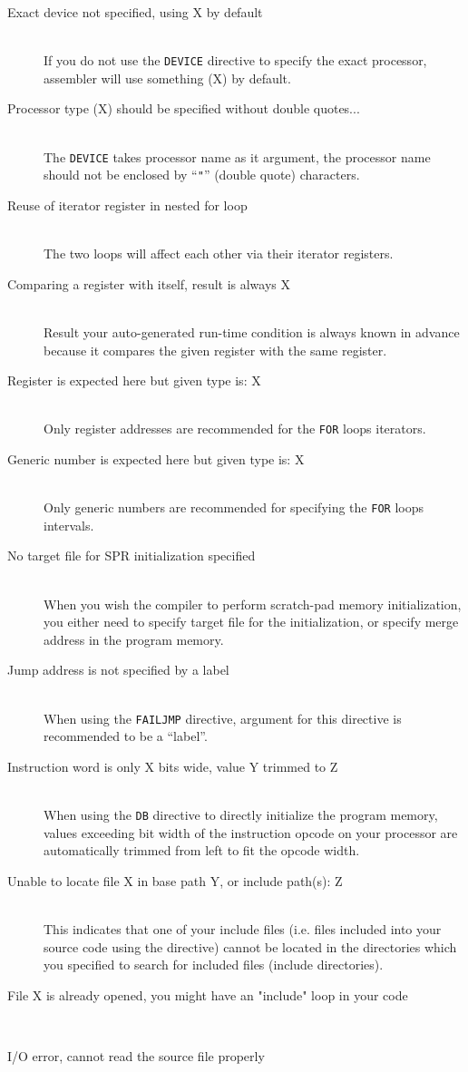 \begin{description}
        \item[Exact device not specified, using X by default]~\\
            If you do not use the \texttt{DEVICE} directive to specify the exact processor, assembler will use something (X) by default.
        \item[Processor type (X) should be specified without double quotes...]~\\
            The \texttt{DEVICE} takes processor name as it argument, the processor name should not be enclosed by ``\texttt{"}'' (double quote) characters.
        \item[Reuse of iterator register in nested for loop]~\\
            The two loops will affect each other via their iterator registers.
        \item[Comparing a register with itself, result is always X]~\\
            Result your auto-generated run-time condition is always known in advance because it compares the given register with the same register.
        \item[Register is expected here but given type is: X]~\\
            Only register addresses are recommended for the \texttt{FOR} loops iterators.
        \item[Generic number is expected here but given type is: X]~\\
            Only generic numbers are recommended for specifying the \texttt{FOR} loops intervals.
        \item[No target file for SPR initialization specified]~\\
            When you wish the compiler to perform scratch-pad memory initialization, you either need to specify target file for the initialization, or specify merge address in the program memory.
        \item[Jump address is not specified by a label]~\\
            When using the \texttt{FAILJMP} directive, argument for this directive is recommended to be a ``label''.
        \item[Instruction word is only X bits wide, value Y trimmed to Z]~\\
            When using the \texttt{DB} directive to directly initialize the program memory, values exceeding bit width of the instruction opcode on your processor are automatically trimmed from left to fit the opcode width.
        \item[Unable to locate file X in base path Y, or include path(s): Z]~\\
            This indicates that one of your include files (i.e. files included into your source code using the  directive) cannot be located in the directories which you specified to search for included files (include directories).
        \item[File X is already opened, you might have an "include" loop in your code]~\\
        \item[I/O error, cannot read the source file properly]~\\
    \end{description}
